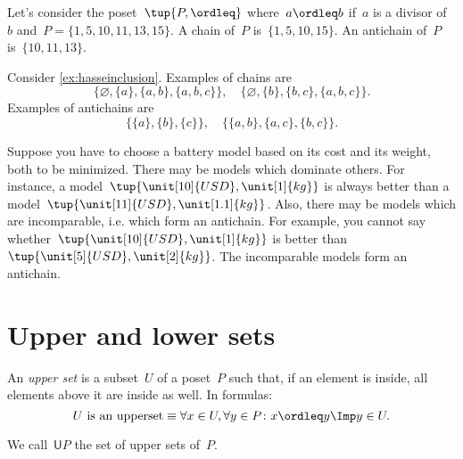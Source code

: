 \begin{example}
    Let's consider the poset~$\tup{P,\ordleq}$ where~$a\ordleq b$ if~$a$ is a divisor of~$b$ and~$P=\{1,5,10,11,13,15\}$. A chain of~$P$ is~$\{1,5,10,15\}$. An antichain of~$P$ is~$\{10,11,13\}$.
\end{example}

\begin{example}
    Consider \cref{ex:hasseinclusion}. Examples of chains are
    \begin{equation}
        \{\varnothing,\{a\},\{a,b\},\{a,b,c\}\}, \quad  \{\varnothing,\{b\},\{b,c\},\{a,b,c\}\}.
    \end{equation}
    Examples of antichains are
    \begin{equation}
        \{\{a\},\{b\},\{c\}\}, \quad \{ \{a,b\},\{a,c\}, \{b,c\}\}.
    \end{equation}
\end{example}

\begin{example}
    \label{ex:battery}
    Suppose you have to choose a battery model based on its cost and its weight, both to be minimized. There may be models which dominate others. For instance, a model~$\tup{\unit[10]{USD},\unit[1]{kg}}$ is always better than a model~$\tup{\unit[11]{USD},\unit[1.1]{kg}}$. Also, there may be models which are incomparable, i.e. which form an antichain. For example, you cannot say whether~$\tup{\unit[10]{USD},\unit[1]{kg}}$ is better than~$\tup{\unit[5]{USD},\unit[2]{kg}}$. The incomparable models form an antichain.
\end{example}


\section{Upper and lower sets}

\begin{definition}
    \label{def:upperset}
    An \emph{upper set} is a subset~$U$ of a poset~$P$ such
    that, if an element is inside, all elements above it are inside as well.
    In formulas:
    \begin{equation}
        \text{$U$ is an upperset} \equiv \forall x\in U, \forall y\in P\colon x\ordleq y \Imp y\in U.
    \end{equation}
\end{definition}
\begin{remark}
    We call~$\mathsf{U}P$ the set of upper sets of~$P$.
\end{remark}

